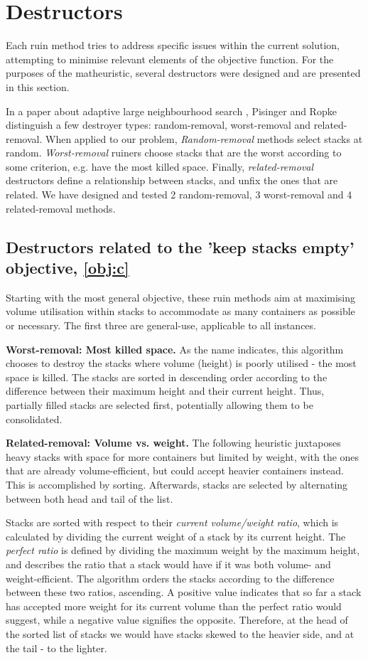 \documentclass[preprint,12pt,3p]{elsarticle}
\begin{document}
\section{Destructors}
\label{sec:Neighbourhoods}
Each ruin method tries to address specific issues within the current solution, attempting to minimise relevant elements of the objective function. For the purposes of the matheuristic, several destructors were designed and are presented in this section.

In a paper about adaptive large neighbourhood search \cite{PR-ALNS}, Pisinger and Ropke distinguish a few destroyer types: random-removal, worst-removal and related-removal. When applied to our problem, \textit{Random-removal} methods select stacks at random. \textit{Worst-removal} ruiners choose stacks that are the worst according to some criterion, e.g. have the most killed space. Finally, \textit{related-removal} destructors define a relationship between stacks, and unfix the ones that are related. We have designed and tested 2 random-removal, 3 worst-removal and 4 related-removal methods.

\subsection{Destructors related to the 'keep stacks empty' objective, \ref{obj:c}}
Starting with the most general objective, these ruin methods aim at maximising volume utilisation within stacks to accommodate as many containers as possible or necessary. The first three are general-use, applicable to all instances.

\textbf{Worst-removal: Most killed space.} As the name indicates, this algorithm chooses to destroy the stacks where volume (height) is poorly utilised - the most space is killed. The stacks are sorted in descending order according to the difference between their maximum height and their current height. Thus, partially filled stacks are selected first, potentially allowing them to be consolidated.

\textbf{Related-removal: Volume vs. weight.} The following heuristic juxtaposes heavy stacks with space for more containers but limited by weight, with the ones that are already volume-efficient, but could accept heavier containers instead. This is accomplished by sorting. Afterwards, stacks are selected by alternating between both head and tail of the list.

Stacks are sorted with respect to their \textit{current volume/weight ratio}, which is calculated by dividing the current weight of a stack by its current height. The \textit{perfect ratio} is defined by dividing the maximum weight by the maximum height, and describes the ratio that a stack would have if it was both volume- and weight-efficient. The algorithm orders the stacks according to the difference between these two ratios, ascending. A positive value indicates that so far a stack has accepted more weight for its current volume than the perfect ratio would suggest, while a negative value signifies the opposite. Therefore, at the head of the sorted list of stacks we would have stacks skewed to the heavier side, and at the tail - to the lighter.
\end{document}
